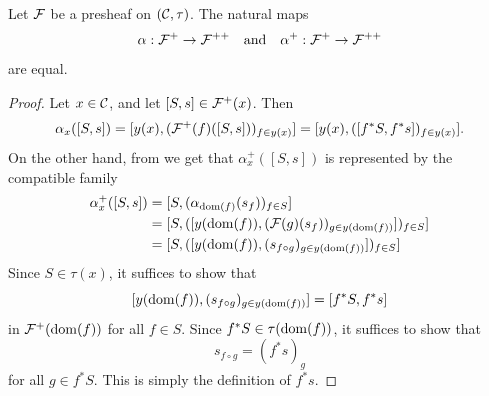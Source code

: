 \begin{proposition}\label{prop:chap:sheaves:sec:sites:two natural maps from plus to double plus are equal}
    Let $\cal{F}$ be a presheaf on $(\catC,\tau)$. The natural maps
    \[\alpha : \cal{F}^+ \to \cal{F}^{++} \quad\text{and}\quad \alpha^+ : \cal{F}^+ \to \cal{F}^{++}\]
    are equal.
\end{proposition}
\begin{proof}
    Let $x \in \catC$, and let $[S,s] \in \cal{F}^+(x)$. Then
    \[\alpha_x([S,s]) = [y(x), (\cal{F}^+(f)([S,s]))_{f \in y(x)}] = [y(x), ([f^* S, f^* s])_{f \in y(x)}].\]
    On the other hand, from  we get that $\alpha^+_x([S,s])$ is represented by the compatible family
    \begin{align*}
        \alpha_x^+([S,s]) & = [S, (\alpha_{\dom(f)}(s_f))_{f \in S}]                              \\
                          & = [S, ([y(\dom(f)), (\cal{F}(g)(s_f))_{g \in y(\dom(f))}])_{f \in S}] \\
                          & = [S, ([y(\dom(f)), (s_{f \circ g})_{g \in y(\dom(f))}])_{f \in S}]
    \end{align*}
    Since $S \in \tau(x)$, it suffices to show that
    \[[y(\dom(f)), (s_{f \circ g})_{g \in y(\dom(f))}] = [f^* S, f^* s]\]
    in $\cal{F}^+(\dom(f))$ for all $f \in S$. Since $f^* S \in \tau(\dom(f))$, it suffices to show that
    \[s_{f \circ g} = (f^* s)_g\]
    for all $g \in f^* S$. This is simply the definition of $f^* s$.
\end{proof}

